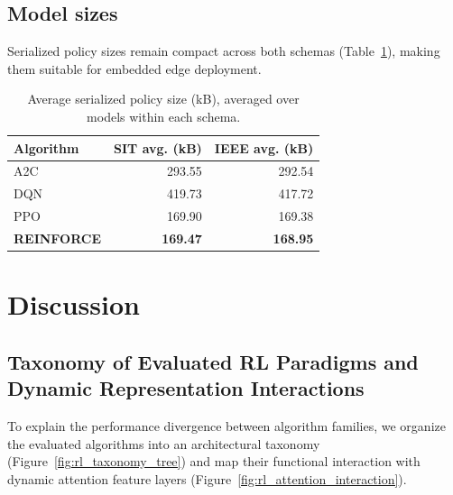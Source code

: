 \documentclass[sn-basic]{sn-jnl}%
\begin{document}
\subsection{Model sizes}
Serialized policy sizes remain compact across both schemas (Table~\ref{tab:model_size_summary}), making them suitable for embedded edge deployment.

\begin{table}[htbp]
\centering
\caption{Average serialized policy size (kB), averaged over models within each schema.}
\label{tab:model_size_summary}
\begin{tabular}{l r r}
\toprule
	\textbf{Algorithm} & \textbf{SIT avg. (kB)} & \textbf{IEEE avg. (kB)}\\
	\midrule
	A2C & 293.55 & 292.54\\
	DQN & 419.73 & 417.72\\
	PPO & 169.90 & 169.38\\
	\textbf{REINFORCE} & \textbf{169.47} & \textbf{168.95}\\
\bottomrule
\end{tabular}
\end{table}


\section{Discussion}
\label{sec:discussion}

\subsection{Taxonomy of Evaluated RL Paradigms and Dynamic Representation Interactions}

To explain the performance divergence between algorithm families, we organize the evaluated algorithms into an architectural taxonomy (Figure~\ref{fig:rl_taxonomy_tree}) and map their functional interaction with dynamic attention feature layers (Figure~\ref{fig:rl_attention_interaction}).
\end{document}
